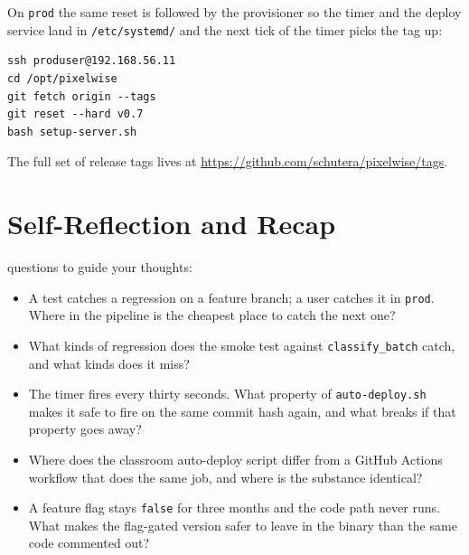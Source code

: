 
On \texttt{prod} the same reset is followed by the provisioner so
the timer and the deploy service land in \texttt{/etc/systemd/}
and the next tick of the timer picks the tag up:

\begin{verbatim}
ssh produser@192.168.56.11
cd /opt/pixelwise
git fetch origin --tags
git reset --hard v0.7
bash setup-server.sh
\end{verbatim}

The full set of release tags lives at
\url{https://github.com/schutera/pixelwise/tags}.



\newpage
\section{Self-Reflection and Recap}

 questions to guide your thoughts:
\begin{itemize}
    \item A test catches a regression on a feature branch; a user catches it in \texttt{prod}. Where in the pipeline is the cheapest place to catch the next one?
    \item What kinds of regression does the smoke test against \texttt{classify\_batch} catch, and what kinds does it miss?
    \item The timer fires every thirty seconds. What property of \texttt{auto-deploy.sh} makes it safe to fire on the same commit hash again, and what breaks if that property goes away?
    \item Where does the classroom auto-deploy script differ from a GitHub Actions workflow that does the same job, and where is the substance identical?
    \item A feature flag stays \texttt{false} for three months and the code path never runs. What makes the flag-gated version safer to leave in the binary than the same code commented out?
\end{itemize}

